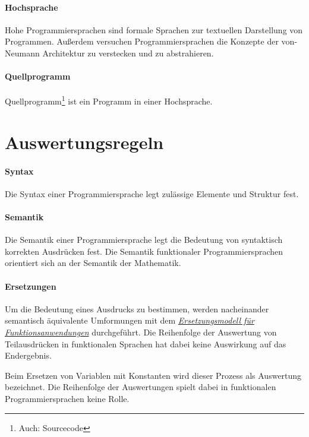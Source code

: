 \documentclass[../main.tex]{subfiles}
\begin{document}
            \paragraph{Hochsprache}
                Hohe Programmiersprachen sind formale Sprachen zur textuellen Darstellung von Programmen. Außerdem versuchen Programmiersprachen die Konzepte der von-Neumann Architektur zu verstecken und zu abstrahieren.
                
            \paragraph{Quellprogramm}
                Quellprogramm\footnote{Auch: Sourcecode} ist ein Programm in einer Hochsprache.
                
    \section{Auswertungsregeln}
        \paragraph{Syntax}
            Die Syntax einer Programmiersprache legt zulässige Elemente und Struktur fest.
            
        \paragraph{Semantik}
            Die Semantik einer Programmiersprache legt die Bedeutung von syntaktisch korrekten Ausdrücken fest. Die Semantik funktionaler Programmiersprachen orientiert sich an der Semantik der Mathematik.
            
        \paragraph{Ersetzungen}
            Um die Bedeutung eines Ausdrucks zu bestimmen, werden nacheinander semantisch äquivalente Umformungen mit dem \hyperref[section:Programmierung:Auswertungsregeln:ErsetzungsmodellFunktionsanwendungen]{\emph{Ersetzungsmodell für Funktionsanwendungen}} durchgeführt. Die Reihenfolge der Auswertung von Teilausdrücken in funktionalen Sprachen hat dabei keine Auswirkung auf das Endergebnis.
            
            Beim Ersetzen von Variablen mit Konstanten wird dieser Prozess als Auswertung bezeichnet. Die Reihenfolge der Auswertungen spielt dabei in funktionalen Programmiersprachen keine Rolle.
            
\end{document}
